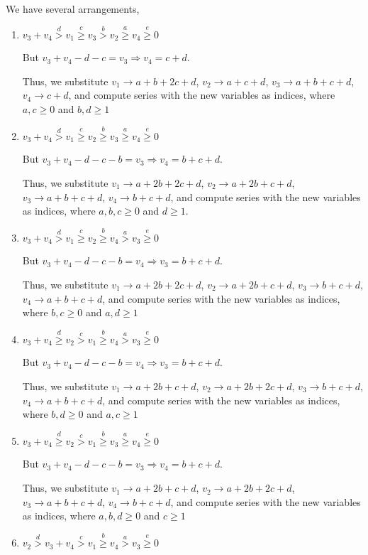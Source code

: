 \documentclass{article}
\begin{document}
We have several arrangements,
\begin{enumerate}
    \item 
$v_3+v_4\overset{d}{>}v_1\overset{c}{\geq}v_3\overset{b}{>}{v_2}\overset{a}{\geq}v_4\overset{e}{\geq}{0}$

But $v_3+v_4-d-c=v_3\Rightarrow{v_4=c+d}.$

Thus, we substitute $v_1\rightarrow{a+b+2c+d}$, $v_2\rightarrow{a+c+d}$, $v_3\rightarrow{a+b+c+d}$, $v_4\rightarrow{c+d}$, and compute series with the new variables as indices, where $a,c\geq{0}$ and $b,d\geq{1}$  
    \item 
$v_3+v_4\overset{d}{>}v_1\overset{c}{\geq}v_2\overset{b}{\geq}{v_3}\overset{a}{\geq}v_4\overset{e}{\geq}{0}$

But $v_3+v_4-d-c-b=v_3\Rightarrow{v_4=b+c+d}.$

Thus, we substitute $v_1\rightarrow{a+2b+2c+d}$, $v_2\rightarrow{a+2b+c+d}$, $v_3\rightarrow{a+b+c+d}$, $v_4\rightarrow{b+c+d}$, and compute series with the new variables as indices, where $a,b,c\geq{0}$ and $d\geq{1}$.  
    \item 
$v_3+v_4\overset{d}{>}v_1\overset{c}{\geq}v_2\overset{b}{\geq}{v_4}\overset{a}{>}v_3\overset{e}{\geq}{0}$

But $v_3+v_4-d-c-b=v_4\Rightarrow{v_3=b+c+d}.$

Thus, we substitute $v_1\rightarrow{a+2b+2c+d}$, $v_2\rightarrow{a+2b+c+d}$, $v_3\rightarrow{b+c+d}$, $v_4\rightarrow{a+b+c+d}$, and compute series with the new variables as indices, where $b,c\geq{0}$ and $a,d\geq{1}$
    \item 
$v_3+v_4\overset{d}{\geq}v_2\overset{c}{>}v_1\overset{b}{\geq}{v_4}\overset{a}{>}v_3\overset{e}{\geq}{0}$

But $v_3+v_4-d-c-b=v_4\Rightarrow{v_3=b+c+d}.$

Thus, we substitute $v_1\rightarrow{a+2b+c+d}$, $v_2\rightarrow{a+2b+2c+d}$, $v_3\rightarrow{b+c+d}$, $v_4\rightarrow{a+b+c+d}$, and compute series with the new variables as indices, where $b,d\geq{0}$ and $a,c\geq{1}$
    \item 
$v_3+v_4\overset{d}{\geq}v_2\overset{c}{>}v_1\overset{b}{\geq}{v_3}\overset{a}{\geq}v_4\overset{e}{\geq}{0}$

But $v_3+v_4-d-c-b=v_3\Rightarrow{v_4=b+c+d}.$

Thus, we substitute $v_1\rightarrow{a+2b+c+d}$, $v_2\rightarrow{a+2b+2c+d}$, $v_3\rightarrow{a+b+c+d}$, $v_4\rightarrow{b+c+d}$, and compute series with the new variables as indices, where $a,b,d\geq{0}$ and $c\geq{1}$
    \item 
$v_2\overset{d}{>}v_3+v_4\overset{c}{>}v_1\overset{b}{\geq}{v_4}\overset{a}{>}v_3\overset{e}{\geq}{0}$


\end{enumerate}
\end{document}
